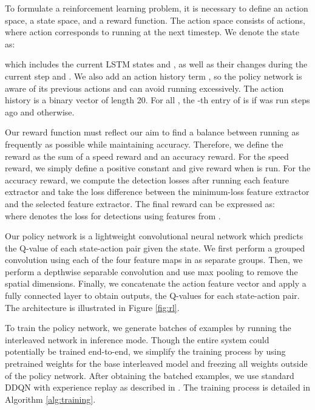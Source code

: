 \documentclass[10pt,twocolumn,letterpaper]{article}
\newcommand\todo[1]{\textcolor{red}{#1}}
\begin{document}
To formulate a reinforcement learning problem, it is necessary to define an action space, a state space, and a reward function. The action space consists of  actions, where action  corresponds to running  at the next timestep. We denote the state as:

which includes the current LSTM states  and , as well as their changes during the current step  and . We also add an action history term , so the policy network is aware of its previous actions and can avoid running  excessively. The action history is a binary vector of length 20. For all , the -th entry of  is  if  was run  steps ago and  otherwise. \todo{}

Our reward function must reflect our aim to find a balance between running  as frequently as possible while maintaining accuracy. Therefore, we define the reward as the sum of a speed reward and an accuracy reward. For the speed reward, we simply define a positive constant  and give  reward when  is run. For the accuracy reward, we compute the detection losses after running each feature extractor and take the loss difference between the minimum-loss feature extractor and the selected feature extractor. The final reward can be expressed as: \\

where  denotes the loss for detections  using features from . 

Our policy network is a lightweight convolutional neural network which predicts the Q-value of each state-action pair given the state. We first perform a grouped convolution using each of the four feature maps in  as separate groups. Then, we perform a depthwise separable convolution and use max pooling to remove the spatial dimensions. Finally, we concatenate the action feature vector and apply a fully connected layer to obtain  outputs, the Q-values for each state-action pair. The architecture is illustrated in Figure \ref{fig:rl}.

To train the policy network, we generate batches of  examples by running the interleaved network in inference mode. Though the entire system could potentially be trained end-to-end, we simplify the training process by using pretrained weights for the base interleaved model and freezing all weights outside of the policy network. After obtaining the batched examples, we use standard DDQN with experience replay as described in \cite{van2016deep}. The training process is detailed in Algorithm \ref{alg:training}.
\end{document}
